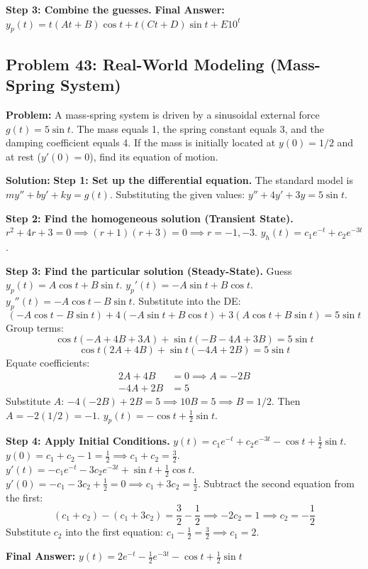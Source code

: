 \documentclass[12pt]{article}
\begin{document}
\textbf{Step 3: Combine the guesses.}
\textbf{Final Answer:} $y_p(t) = t(At + B)\cos t + t(Ct + D)\sin t + E 10^t$

\subsection{Problem 43: Real-World Modeling (Mass-Spring System)}
\textbf{Problem:} A mass-spring system is driven by a sinusoidal external force $g(t) = 5 \sin t$. The mass equals 1, the spring constant equals 3, and the damping coefficient equals 4. If the mass is initially located at $y(0) = 1/2$ and at rest ($y'(0) = 0$), find its equation of motion.

\textbf{Solution:}
\textbf{Step 1: Set up the differential equation.}
The standard model is $m y'' + b y' + k y = g(t)$.
Substituting the given values: $y'' + 4y' + 3y = 5 \sin t$.

\textbf{Step 2: Find the homogeneous solution (Transient State).}
$r^2 + 4r + 3 = 0 \implies (r + 1)(r + 3) = 0 \implies r = -1, -3$.
$y_h(t) = c_1 e^{-t} + c_2 e^{-3t}$.

\textbf{Step 3: Find the particular solution (Steady-State).}
Guess $y_p(t) = A \cos t + B \sin t$.
$y_p'(t) = -A \sin t + B \cos t$.
$y_p''(t) = -A \cos t - B \sin t$.
Substitute into the DE:
\[ (-A \cos t - B \sin t) + 4(-A \sin t + B \cos t) + 3(A \cos t + B \sin t) = 5 \sin t \]
Group terms:
\[ \cos t (-A + 4B + 3A) + \sin t (-B - 4A + 3B) = 5 \sin t \]
\[ \cos t (2A + 4B) + \sin t (-4A + 2B) = 5 \sin t \]
Equate coefficients:
\begin{align*}
2A + 4B &= 0 \implies A = -2B \\
-4A + 2B &= 5
\end{align*}
Substitute $A$: $-4(-2B) + 2B = 5 \implies 10B = 5 \implies B = 1/2$.
Then $A = -2(1/2) = -1$.
$y_p(t) = -\cos t + \frac{1}{2} \sin t$.

\textbf{Step 4: Apply Initial Conditions.}
$y(t) = c_1 e^{-t} + c_2 e^{-3t} - \cos t + \frac{1}{2} \sin t$.
$y(0) = c_1 + c_2 - 1 = \frac{1}{2} \implies c_1 + c_2 = \frac{3}{2}$.
$y'(t) = -c_1 e^{-t} - 3c_2 e^{-3t} + \sin t + \frac{1}{2} \cos t$.
$y'(0) = -c_1 - 3c_2 + \frac{1}{2} = 0 \implies c_1 + 3c_2 = \frac{1}{2}$.
Subtract the second equation from the first:
\[ (c_1 + c_2) - (c_1 + 3c_2) = \frac{3}{2} - \frac{1}{2} \implies -2c_2 = 1 \implies c_2 = -\frac{1}{2} \]
Substitute $c_2$ into the first equation: $c_1 - \frac{1}{2} = \frac{3}{2} \implies c_1 = 2$.

\textbf{Final Answer:} $y(t) = 2e^{-t} - \frac{1}{2}e^{-3t} - \cos t + \frac{1}{2}\sin t$
\end{document}
